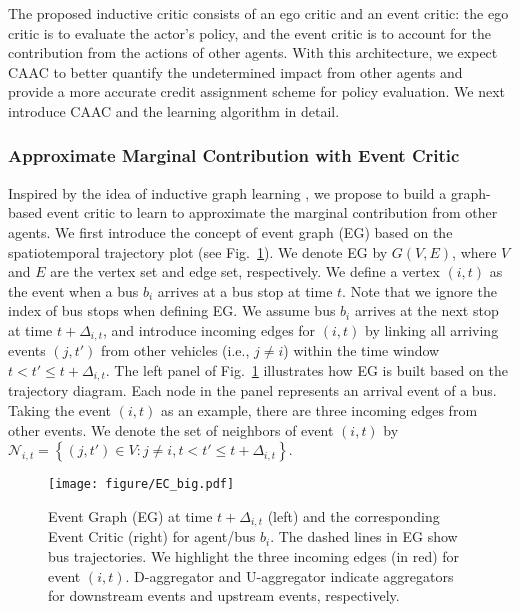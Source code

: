 \documentclass{article}
\begin{document}
The proposed inductive critic consists of an ego critic and an event critic: the ego critic is to evaluate the actor's policy, and the event critic is to account for the contribution from the actions of other agents. With this architecture, we expect CAAC to better quantify the undetermined impact from other agents and provide a more accurate credit assignment scheme for policy evaluation. We next introduce CAAC and the learning algorithm in detail.


\subsubsection{Approximate Marginal Contribution with Event Critic}
Inspired by the idea of inductive graph learning \cite{hamilton2017inductive}, we propose to build a graph-based event critic to learn to approximate the marginal contribution from other agents. We first introduce the concept of event graph (EG) based on the spatiotemporal trajectory plot (see Fig.~\ref{fig:EC}). We denote EG by ${G}\left({V},{E}\right)$, where ${V}$ and ${E}$ are the vertex set and edge set, respectively. We define a vertex $(i,t)$ as the event when a bus $b_i$ arrives at a bus stop at time $t$. Note that we ignore the index of bus stops when defining EG. We assume bus $b_i$ arrives at the next stop at time $t+\Delta_{i,t}$, and introduce incoming edges for $(i,t)$ by linking all arriving events $\left(j,t'\right)$ from other vehicles (i.e., $j\neq i$) within the time window $t<t'\le t+\Delta_{i,t}$. The left panel of Fig.~\ref{fig:EC} illustrates how EG is built based on the trajectory diagram. Each node in the panel represents an arrival event of a bus. Taking the event $\left(i,t\right)$ as an example, there are three incoming edges from other events. We denote the set of neighbors of event $\left(i,t\right)$ by $\mathcal{N}_{i,t}=\left\{\left(j,t'\right) \in {V} : j\neq i, t<t'\le t+\Delta_{i,t} \right\}$.







\begin{figure}[!t]
\centering
\texttt{[image: figure/EC\_big.pdf]}
  \caption{{Event Graph} (EG) at time $t+\Delta_{i,t}$ (left) and the corresponding {Event Critic} (right) for agent/bus $b_i$. The dashed lines in EG show bus trajectories. We highlight the three incoming edges (in red) for event $\left(i,t\right)$. D-aggregator and U-aggregator indicate aggregators for downstream events and upstream events, respectively.}
   \label{fig:EC}
\end{figure}
\end{document}
